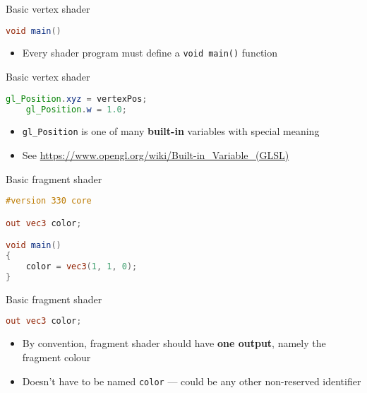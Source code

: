 \begin{frame}[fragile]{Basic vertex shader}
	\begin{lstlisting}[language=GLSL]
void main()
	\end{lstlisting}
	\begin{itemize}
		\pause\item Every shader program must define a \lstinline{void main()} function
	\end{itemize}
\end{frame}

\begin{frame}[fragile]{Basic vertex shader}
	\begin{lstlisting}[language=GLSL]
    gl_Position.xyz = vertexPos;
    gl_Position.w = 1.0;
	\end{lstlisting}
	\begin{itemize}
		\pause\item \lstinline{gl_Position} is one of many \textbf{built-in} variables with special meaning
		\pause\item See \url{https://www.opengl.org/wiki/Built-in_Variable_(GLSL)}
	\end{itemize}
\end{frame}

\begin{frame}[fragile]{Basic fragment shader}
	\begin{lstlisting}[language=GLSL]
#version 330 core

out vec3 color;

void main()
{
    color = vec3(1, 1, 0);
}
	\end{lstlisting}
\end{frame}

\begin{frame}[fragile]{Basic fragment shader}
	\begin{lstlisting}[language=GLSL]
out vec3 color;
	\end{lstlisting}
	\begin{itemize}
		\pause\item By convention, fragment shader should have \textbf{one output}, namely the fragment colour
		\pause\item Doesn't have to be named \lstinline{color} --- could be any other non-reserved identifier
	\end{itemize}
\end{frame}

